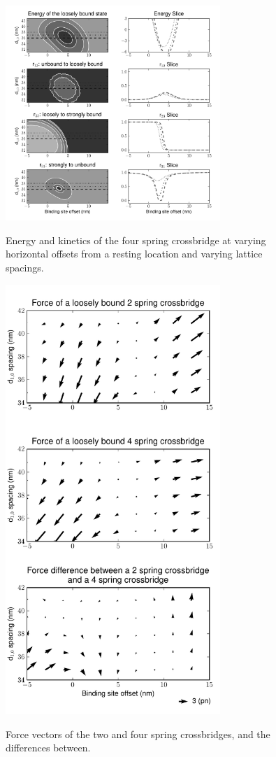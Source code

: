 \documentclass[]{article}
\begin{document}
\begin{figure}[p]
    \begin{center}
    \includegraphics[width=3.2in]{../imgs/Figure3.pdf}
    \label{fig:4s}
    \caption{
        Energy and kinetics of the four spring crossbridge at varying horizontal offsets from a resting location and varying lattice spacings.}
    \end{center}
\end{figure}

\begin{figure}[p]
    \begin{center}
    \includegraphics[width=3.2in]{../imgs/Figure4.pdf}
    \label{fig:force}
    \caption{
        Force vectors of the two and four spring crossbridges, and the differences between.}
    \end{center}
\end{figure}





\end{document}
